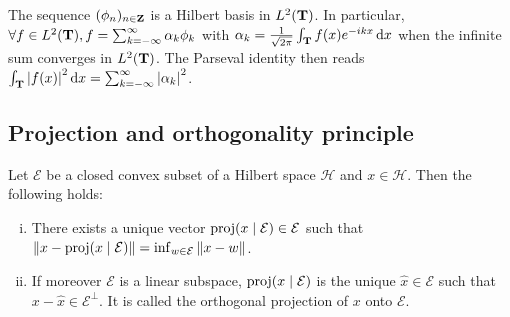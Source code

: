 	\begin{cor}
		The sequence $(\phi_n)_{n \in \mathbf{Z}}$ is a Hilbert basis in $L^2(\mathbf{T})$.
		In particular, $\forall f \in L^2(\mathbf{T}), f = \sum_{k = -\infty}^\infty \alpha_k \phi_k$ with $\alpha_k = \frac{1}{\sqrt{2\pi}} \int_{\mathbf{T}} f(x) e^{-ikx} \mathop{}\mathopen{}\mathrm{d} x$ when the infinite sum converges in $L^2(\mathbf{T})$.
		The Parseval identity then reads $\int_{\mathbf{T}} \left\lvert f(x)\right\rvert^2 \mathop{}\mathopen{}\mathrm{d} x = \sum_{k = -\infty}^\infty \left\lvert\alpha_k\right\rvert^2$.
	\end{cor}
	
\subsection{Projection and orthogonality principle}
	
	\begin{thm}
		Let $\mathcal{E}$ be a closed convex subset of a Hilbert space $\mathcal{H}$ and $x \in \mathcal{H}$.
		Then the following holds:
		\begin{enumerate}[(i)]
			\item There exists a unique vector $\operatorname{proj}(x \mid \mathcal{E}) \in \mathcal{E}$ such that $\left\lVert x - \operatorname{proj}(x \mid \mathcal{E})\right\rVert = \inf_{w \in \mathcal{E}} \left\lVert x - w\right\rVert$.
			\item If moreover $\mathcal{E}$ is a linear subspace, $\operatorname{proj}(x \mid \mathcal{E})$ is the unique $\hat{x} \in \mathcal{E}$ such that $x - \hat{x} \in \mathcal{E}^\perp$. It is called the orthogonal projection of $x$ onto $\mathcal{E}$.
		\end{enumerate}
	\end{thm}
		
		
